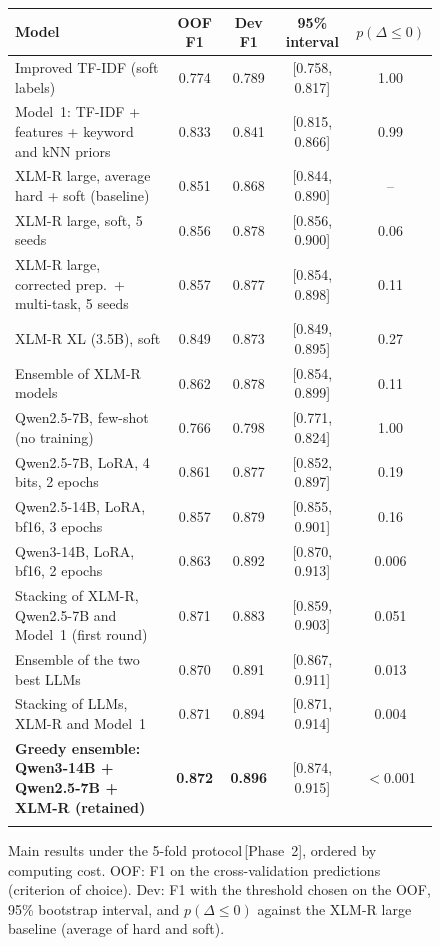 \documentclass[pdflatex,sn-mathphys-num]{sn-jnl}
\makeatletter
\newenvironment{Htable}{\begin{figure}[H]\def\@captype{table}\begin{center}\begin{threeparttable}\tablebodyfont}{\end{threeparttable}\end{center}\end{figure}}
\newcommand{\Ptwo}{\,{\normalfont\textsf{\small[Phase~2]}}}
\makeatother
\begin{document}
\begin{Htable}
\caption{Main results under the 5-fold protocol\Ptwo, ordered by computing cost. OOF: F1 on the cross-validation predictions (criterion of choice). Dev: F1 with the threshold chosen on the OOF, 95\% bootstrap interval, and $p(\Delta\le 0)$ against the XLM-R large baseline (average of hard and soft).}\label{tab:results}
\begin{tabularx}{\textwidth}{@{}Xcccc@{}}
\toprule
Model & OOF F1 & Dev F1 & 95\% interval & $p(\Delta \le 0)$ \\
\midrule
Improved TF-IDF (soft labels) & 0.774 & 0.789 & [0.758, 0.817] & 1.00 \\
Model~1: TF-IDF + features + keyword and kNN priors & 0.833 & 0.841 & [0.815, 0.866] & 0.99 \\
\midrule
XLM-R large, average hard + soft (baseline) & 0.851 & 0.868 & [0.844, 0.890] & -- \\
XLM-R large, soft, 5 seeds & 0.856 & 0.878 & [0.856, 0.900] & 0.06 \\
XLM-R large, corrected prep.\ + multi-task, 5 seeds & 0.857 & 0.877 & [0.854, 0.898] & 0.11 \\
XLM-R XL (3.5B), soft & 0.849 & 0.873 & [0.849, 0.895] & 0.27 \\
Ensemble of XLM-R models & 0.862 & 0.878 & [0.854, 0.899] & 0.11 \\
\midrule
Qwen2.5-7B, few-shot (no training) & 0.766 & 0.798 & [0.771, 0.824] & 1.00 \\
Qwen2.5-7B, LoRA, 4 bits, 2 epochs & 0.861 & 0.877 & [0.852, 0.897] & 0.19 \\
Qwen2.5-14B, LoRA, bf16, 3 epochs & 0.857 & 0.879 & [0.855, 0.901] & 0.16 \\
Qwen3-14B, LoRA, bf16, 2 epochs & 0.863 & 0.892 & [0.870, 0.913] & 0.006 \\
Stacking of XLM-R, Qwen2.5-7B and Model~1 (first round) & 0.871 & 0.883 & [0.859, 0.903] & 0.051 \\
Ensemble of the two best LLMs & 0.870 & 0.891 & [0.867, 0.911] & 0.013 \\
Stacking of LLMs, XLM-R and Model~1 & 0.871 & 0.894 & [0.871, 0.914] & 0.004 \\
\textbf{Greedy ensemble: Qwen3-14B + Qwen2.5-7B + XLM-R (retained)} & \textbf{0.872} & \textbf{0.896} & [0.874, 0.915] & $<$0.001 \\
\botrule
\end{tabularx}
\end{Htable}
\end{document}
